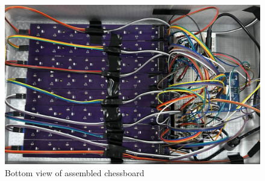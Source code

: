 \documentclass[11pt,journal]{IEEEtran}
\begin{document}
\begin{figure}[ht]
  \includegraphics[width=\linewidth]{boardBottom.jpg}
  \caption{Bottom view of assembled chessboard}
  \label{boardbottom}
\end{figure}
\end{document}
